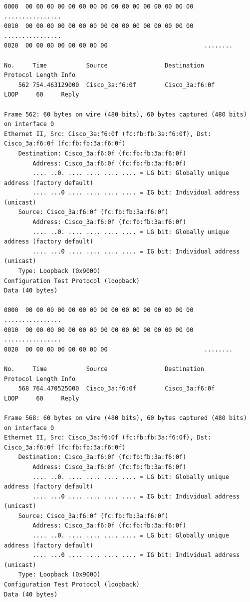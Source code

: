 \documentclass[a4paper,11pt]{article}
\begin{document}
\begin{lstlisting}
0000  00 00 00 00 00 00 00 00 00 00 00 00 00 00 00 00   ................
0010  00 00 00 00 00 00 00 00 00 00 00 00 00 00 00 00   ................
0020  00 00 00 00 00 00 00 00                           ........

No.     Time           Source                Destination           Protocol Length Info
    562 754.463129000  Cisco_3a:f6:0f        Cisco_3a:f6:0f        LOOP     60     Reply

Frame 562: 60 bytes on wire (480 bits), 60 bytes captured (480 bits) on interface 0
Ethernet II, Src: Cisco_3a:f6:0f (fc:fb:fb:3a:f6:0f), Dst: Cisco_3a:f6:0f (fc:fb:fb:3a:f6:0f)
    Destination: Cisco_3a:f6:0f (fc:fb:fb:3a:f6:0f)
        Address: Cisco_3a:f6:0f (fc:fb:fb:3a:f6:0f)
        .... ..0. .... .... .... .... = LG bit: Globally unique address (factory default)
        .... ...0 .... .... .... .... = IG bit: Individual address (unicast)
    Source: Cisco_3a:f6:0f (fc:fb:fb:3a:f6:0f)
        Address: Cisco_3a:f6:0f (fc:fb:fb:3a:f6:0f)
        .... ..0. .... .... .... .... = LG bit: Globally unique address (factory default)
        .... ...0 .... .... .... .... = IG bit: Individual address (unicast)
    Type: Loopback (0x9000)
Configuration Test Protocol (loopback)
Data (40 bytes)

0000  00 00 00 00 00 00 00 00 00 00 00 00 00 00 00 00   ................
0010  00 00 00 00 00 00 00 00 00 00 00 00 00 00 00 00   ................
0020  00 00 00 00 00 00 00 00                           ........

No.     Time           Source                Destination           Protocol Length Info
    568 764.470525000  Cisco_3a:f6:0f        Cisco_3a:f6:0f        LOOP     60     Reply

Frame 568: 60 bytes on wire (480 bits), 60 bytes captured (480 bits) on interface 0
Ethernet II, Src: Cisco_3a:f6:0f (fc:fb:fb:3a:f6:0f), Dst: Cisco_3a:f6:0f (fc:fb:fb:3a:f6:0f)
    Destination: Cisco_3a:f6:0f (fc:fb:fb:3a:f6:0f)
        Address: Cisco_3a:f6:0f (fc:fb:fb:3a:f6:0f)
        .... ..0. .... .... .... .... = LG bit: Globally unique address (factory default)
        .... ...0 .... .... .... .... = IG bit: Individual address (unicast)
    Source: Cisco_3a:f6:0f (fc:fb:fb:3a:f6:0f)
        Address: Cisco_3a:f6:0f (fc:fb:fb:3a:f6:0f)
        .... ..0. .... .... .... .... = LG bit: Globally unique address (factory default)
        .... ...0 .... .... .... .... = IG bit: Individual address (unicast)
    Type: Loopback (0x9000)
Configuration Test Protocol (loopback)
Data (40 bytes)


\end{lstlisting}
\end{document}
